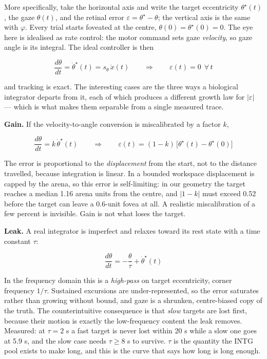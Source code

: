 \documentclass[10pt]{article}
\begin{document}
More specifically, take the horizontal axis and write the target eccentricity
$\theta^{\star}(t)$, the gaze $\theta(t)$, and the retinal error $\varepsilon =
\theta^{\star} - \theta$; the vertical axis is the same with $\varphi$. Every trial starts
foveated at the centre, $\theta(0)=\theta^{\star}(0)=0$. The eye here is idealised as rate
control: the motor command sets gaze \emph{velocity}, so gaze angle is its integral. The
ideal controller is then

\begin{equation}
\label{eq:ideal-tracking}
\frac{d\theta}{dt} = \dot\theta^{\star}(t) = s_\theta\,\dot x(t)
\qquad\Longrightarrow\qquad
\varepsilon(t) = 0 \ \ \forall\, t
\end{equation}

and tracking is exact. The interesting cases are the three ways a biological integrator
departs from it, each of which produces a different growth law for $|\varepsilon|$ --- which
is what makes them separable from a single measured trace.

\textbf{Gain.} If the velocity-to-angle conversion is miscalibrated by a factor $k$,

\begin{equation}
\label{eq:gain-error}
\frac{d\theta}{dt} = k\,\dot\theta^{\star}(t)
\qquad\Longrightarrow\qquad
\varepsilon(t) = (1-k)\,\big[\theta^{\star}(t)-\theta^{\star}(0)\big]
\end{equation}

The error is proportional to the \emph{displacement} from the start, not to the distance
travelled, because integration is linear. In a bounded workspace displacement is capped by
the arena, so this error is self-limiting: in our geometry the target reaches a median 1.16
arena units from the centre, and $|1-k|$ must exceed 0.52 before the target can leave a
0.6-unit fovea at all. A realistic miscalibration of a few percent is invisible. Gain is not
what loses the target.

\textbf{Leak.} A real integrator is imperfect and relaxes toward its rest state with a time
constant $\tau$:

\begin{equation}
\label{eq:leak-error}
\frac{d\theta}{dt} = -\frac{\theta}{\tau} + \dot\theta^{\star}(t)
\end{equation}

In the frequency domain this is a \emph{high-pass} on target eccentricity, corner frequency
$1/\tau$. Sustained excursions are under-represented, so the error saturates rather than
growing without bound, and gaze is a shrunken, centre-biased copy of the truth. The
counterintuitive consequence is that \emph{slow} targets are lost first, because their
motion is exactly the low-frequency content the leak removes. Measured: at $\tau = 2$ s a
fast target is never lost within 20 s while a slow one goes at 5.9 s, and the slow case
needs $\tau \geq 8$ s to survive. $\tau$ is the quantity the INTG pool exists to make long,
and this is the curve that says how long is long enough.
\end{document}
